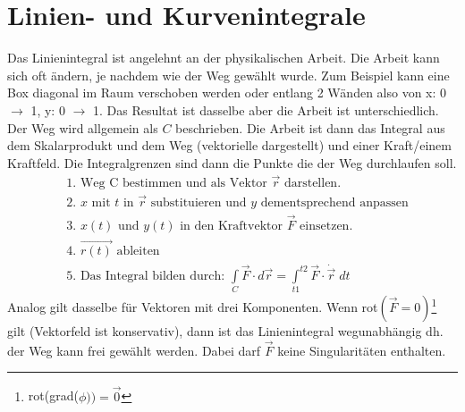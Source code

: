 \documentclass[a4paper,10pt]{scrartcl}
\begin{document}
    \section{Linien- und Kurvenintegrale}
        Das Linienintegral ist angelehnt an der physikalischen Arbeit. Die Arbeit kann sich oft ändern, je nachdem wie der Weg gewählt wurde. Zum Beispiel kann eine Box diagonal im Raum verschoben werden
        oder entlang 2 Wänden also von x: 0 \(\rightarrow\) 1, y: 0 \(\rightarrow\) 1. Das Resultat ist dasselbe aber die Arbeit ist unterschiedlich. \\
        Der Weg wird allgemein als \(C\) beschrieben. Die Arbeit ist dann das Integral aus dem Skalarprodukt und dem Weg (vektorielle dargestellt) und einer Kraft/einem Kraftfeld. Die Integralgrenzen
        sind dann die Punkte die der Weg durchlaufen soll.
        \begin{equation*}
            \begin{aligned}
                & \text{1. Weg C bestimmen und als Vektor \(\vec{r}\) darstellen. } \\
                & \text{2. \(x\) mit \(t\) in \(\vec{r}\) substituieren und \(y\) dementsprechend anpassen} \\
                & \text{3. \(x(t)\) und \(y(t)\) in den Kraftvektor \(\vec{F}\) einsetzen.  } \\
                & \text{4. \(\vec{r(t)}\) ableiten } \\
                & \text{5. Das Integral bilden durch: } {\int\limits_C} \vec{F} \cdot d\vec{r} = {\int\limits_{t1}}^{t2} \vec{F} \cdot \dot{\vec{r}} \; dt
            \end{aligned}
        \end{equation*}
        Analog gilt dasselbe für Vektoren mit drei Komponenten. Wenn rot\((\vec{F} = 0)\)\footnote{rot(grad(\(\phi)) = \vec{0} \)} gilt (Vektorfeld ist konservativ),
        dann ist das Linienintegral wegunabhängig dh. der Weg kann frei gewählt werden. Dabei darf $\vec{F}$ keine Singularitäten
        enthalten.
\end{document}
